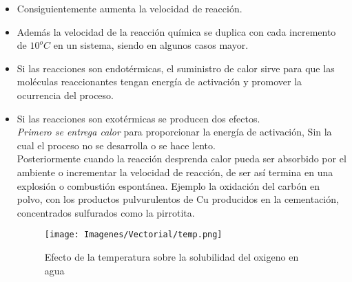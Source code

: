 \begin{itemize}
\begin{itemize}
\item Consiguientemente aumenta la velocidad de reacci\'on.
\item Adem\'as la velocidad de la reacci\'on qu\'imica se duplica con cada incremento de $10^oC$ en un sistema, siendo en algunos casos mayor.
\item Si las reacciones son endot\'ermicas, el suministro de calor sirve para que las mol\'eculas reaccionantes tengan energ\'ia de activaci\'on y promover la ocurrencia del proceso.
\item Si las reacciones son exot\'ermicas se producen dos efectos.\\
\emph{Primero se entrega	calor} para proporcionar la energ\'ia de activaci\'on, Sin la cual el proceso no se desarrolla o se hace lento.\\
Posteriormente cuando la reacci\'on desprenda calor pueda ser absorbido	por el	ambiente o incrementar la velocidad de reacci\'on, de ser as\'i termina en una explosi\'on o combusti\'on espont\'anea. Ejemplo la oxidaci\'on del carb\'on en polvo, con los productos pulvurulentos de Cu producidos en la cementaci\'on, concentrados sulfurados como la pirrotita.

\begin{figure}[H]
 \centering
 \texttt{[image: Imagenes/Vectorial/temp.png]}
 \caption{Efecto de la temperatura sobre la solubilidad del oxigeno en agua}
 \label{fig:tem}
\end{figure}


\end{itemize}
\end{itemize}
